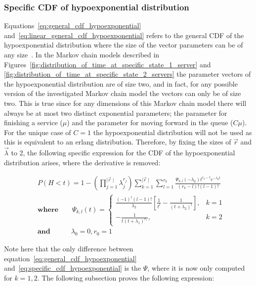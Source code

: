 \subsubsection{Specific CDF of hypoexponential distribution}
Equations~\eqref{eq:general_cdf_hypoexponential}
and~\eqref{eq:linear_general_cdf_hypoexponential} refers to the general CDF
of the
hypoexponential distribution where the size of the vector parameters can be of
any size~\cite{Favaro2010}.
In the Markov chain models described in
Figures~\ref{fig:distribution_of_time_at_specific_state_1_server} and
\ref{fig:distribution_of_time_at_specific_state_2_servers} the parameter vectors
of the hypoexponential distribution are of size two, and in fact, for any
possible version of the investigated Markov chain model the vectors can only be
of size two.
This is true since for any dimensions of this Markov chain model there will
always be at most two distinct exponential parameters; the parameter for
finishing a service (\(\mu\)) and the parameter for moving forward in the queue
(\(C \mu\)).
For the unique case of \(C=1\) the hypoexponential distribution will not be
used as this is equivalent to an erlang distribution.
Therefore, by fixing the sizes of \(\vec{r}\) and \(\vec{\lambda}\) to 2, the
following specific expression for the CDF of the hypoexponential distribution
arises, where the derivative is removed:


\begin{align} \label{eq:specific_cdf_hypoexponential}
    & P(H < t) = 1 - \left( \prod_{j=1}^{\mid \vec{r} \mid} \lambda_j^{r_j}
    \right) \sum_{k=1}^{\mid \vec{r} \mid} \sum_{l=1}^{r_k}
    \frac{\Psi_{k,l}(-\lambda_k)t^{r_k - l} e^{-\lambda_k t}}{(r_k - l)!
    (l - 1)!} \nonumber \\
    & \textbf{where} \qquad \Psi_{k,l}(t) =
    \begin{cases}
        \frac{(-1)^{l} (l-1)!}{\lambda_2} \left[\frac{1}{t^l} - \frac{1}
        {(t + \lambda_2)^l}\right] , & k=1 \\
        - \frac{1}{t (t + \lambda_1)^{r_1}}, & k=2
    \end{cases} \nonumber \\
    & \textbf{and} \quad \qquad \lambda_0 = 0, r_0 = 1
\end{align}

Note here that the only difference between
equation~\eqref{eq:general_cdf_hypoexponential}
and~\eqref{eq:specific_cdf_hypoexponential} is the \(\Psi\), where it is now
only computed for \(k=1,2\).
The following subsection proves the following expression:

